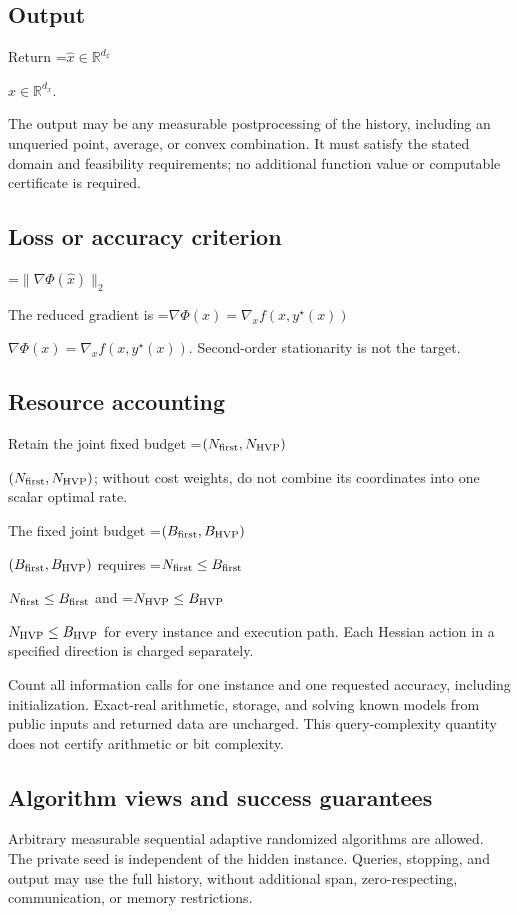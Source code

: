 \documentclass[10pt,a4paper]{article}
\newcommand{\AtlasMath}[1]{\par\begingroup\centering\setbox0=\hbox{$\displaystyle #1$}\ifdim\wd0>1.4\linewidth\typeout{ATLAS WIDE FORMULA: \the\wd0}\fi\ifdim\wd0>\linewidth\resizebox{\linewidth}{!}{\box0}\else\box0\fi\par\endgroup}
\newcommand{\AtlasInlineMath}[1]{\begingroup\setbox0=\hbox{$#1$}\ifdim\wd0>.4\linewidth\endgroup\AtlasMath{#1}\else\endgroup$#1$\fi}
\begin{document}
\subsection{Output}
Return \AtlasInlineMath{\widehat x\in\mathbb R^{d_x}}.

The output may be any measurable postprocessing of the history, including an unqueried point, average, or convex combination. It must satisfy the stated domain and feasibility requirements; no additional function value or computable certificate is required.

\subsection{Loss or accuracy criterion}

\AtlasMath{\|\nabla\Phi(\widehat{x})\|_2}


The reduced gradient is \AtlasInlineMath{\nabla\Phi(x)=\nabla_xf(x,y^\star(x))}. Second-order stationarity is not the target.

\subsection{Resource accounting}
Retain the joint fixed budget \AtlasInlineMath{(N_{\rm first},N_{\rm HVP})}; without cost weights, do not combine its coordinates into one scalar optimal rate.

The fixed joint budget \AtlasInlineMath{(B_{\rm first},B_{\rm HVP})} requires \AtlasInlineMath{N_{\rm first}\le B_{\rm first}} and \AtlasInlineMath{N_{\rm HVP}\le B_{\rm HVP}} for every instance and execution path. Each Hessian action in a specified direction is charged separately.

Count all information calls for one instance and one requested accuracy, including initialization. Exact-real arithmetic, storage, and solving known models from public inputs and returned data are uncharged. This query-complexity quantity does not certify arithmetic or bit complexity.

\subsection{Algorithm views and success guarantees}
Arbitrary measurable sequential adaptive randomized algorithms are allowed. The private seed is independent of the hidden instance. Queries, stopping, and output may use the full history, without additional span, zero-respecting, communication, or memory restrictions.
\end{document}
